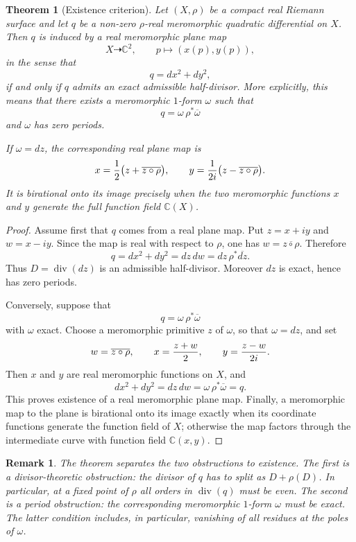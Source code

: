 \documentclass[reqno]{amsart}
\newtheorem{theorem}{Theorem}
\newtheorem{remark}{Remark}
\newcommand{\bC}{\mathbb{C}}
\theoremstyle{definition}
\theoremstyle{remark}
\theoremstyle{definition}
\theoremstyle{definition}
\theoremstyle{definition}
\begin{document}
\begin{theorem}[Existence criterion]\label{thm:existence-criterion}
Let $(X,\rho)$ be a compact real Riemann surface and let $q$ be a non-zero
$\rho$-real meromorphic quadratic differential on $X$. Then $q$ is induced by
a real meromorphic plane map
\[
   X\dashrightarrow \bC^2,\qquad p\mapsto (x(p),y(p)),
\]
in the sense that
\[
   q=dx^2+dy^2,
\]
if and only if $q$ admits an exact admissible half-divisor.  More explicitly,
this means that there exists a meromorphic $1$-form $\omega$ such that
\[
   q=\omega\,\rho^*\overline{\omega}
\]
and $\omega$ has zero periods.

If $\omega=dz$, the corresponding real plane map is
\[
   x={1\over 2}\bigl(z+\overline{z\circ\rho}\bigr),\qquad
   y={1\over 2i}\bigl(z-\overline{z\circ\rho}\bigr).
\]
It is birational onto its image precisely when the two meromorphic functions
$x$ and $y$ generate the full function field $\bC(X)$.
\end{theorem}

\begin{proof}
Assume first that $q$ comes from a real plane map.  Put
$z=x+iy$ and $w=x-iy$.  Since the map is real with respect to $\rho$, one has
$w=\overline{z\circ\rho}$.  Therefore
\[
   q=dx^2+dy^2=dz\,dw=dz\,\rho^*\overline{dz}.
\]
Thus $D=\operatorname{div}(dz)$ is an admissible half-divisor.  Moreover
$dz$ is exact, hence has zero periods.

Conversely, suppose that
\[
   q=\omega\,\rho^*\overline{\omega}
\]
with $\omega$ exact.  Choose a meromorphic primitive $z$ of $\omega$, so that
$\omega=dz$, and set
\[
   w=\overline{z\circ\rho},\qquad
   x={z+w\over 2},\qquad y={z-w\over 2i}.
\]
Then $x$ and $y$ are real meromorphic functions on $X$, and
\[
   dx^2+dy^2=dz\,dw
      =\omega\,\rho^*\overline{\omega}=q.
\]
This proves existence of a real meromorphic plane map.  Finally, a meromorphic
map to the plane is birational onto its image exactly when its coordinate
functions generate the function field of $X$; otherwise the map factors
through the intermediate curve with function field $\bC(x,y)$.
\end{proof}

\begin{remark}\label{rem:existence-obstructions}
The theorem separates the two obstructions to existence.  The first is a
divisor-theoretic obstruction: the divisor of $q$ has to split as
$D+\rho(D)$.  In particular, at a fixed point of $\rho$ all orders in
$\operatorname{div}(q)$ must be even.  The second is a period obstruction: the
corresponding meromorphic $1$-form $\omega$ must be exact.  The latter
condition includes, in particular, vanishing of all residues at the poles of
$\omega$.
\end{remark}
\end{document}
